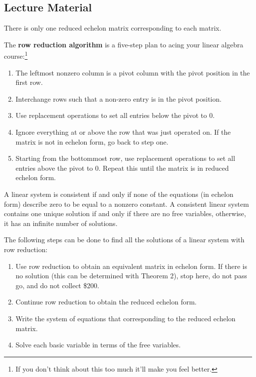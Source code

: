 \documentclass{article}
\begin{document}
\subsection{Lecture Material}

\begin{theorem}
There is only one reduced echelon matrix corresponding to each matrix.
\end{theorem}

The \textbf{row reduction algorithm} is a five-step plan to acing your linear
algebra course:\footnote{If you don't think about this too much it'll make you feel better.}

\begin{enumerate}

\item
The leftmost nonzero column is a pivot column with the pivot position in the
first row.

\item
Interchange rows such that a non-zero entry is in the pivot position.

\item
Use replacement operations to set all entries below the pivot to 0.

\item
Ignore everything at or above the row that was just operated on. If the matrix
is not in echelon form, go back to step one.

\item
Starting from the bottommost row, use replacement operations to set all entries
above the pivot to 0. Repeat this until the matrix is in reduced echelon form.

\end{enumerate}

\begin{theorem}
A linear system is consistent if and only if none of the equations (in echelon
form) describe zero to be equal to a nonzero constant. A consistent linear
system contains one unique solution if and only if there are no free variables,
otherwise, it has an infinite number of solutions.
\end{theorem}

The following steps can be done to find all the solutions of a linear system
with row reduction:

\begin{enumerate}

\item
Use row reduction to obtain an equivalent matrix in echelon form. If there is
no solution (this can be determined with Theorem 2), stop here, do not pass go,
and do not collect \$200.

\item
Continue row reduction to obtain the reduced echelon form.

\item
Write the system of equations that corresponding to the reduced echelon matrix.

\item
Solve each basic variable in terms of the free variables.

\end{enumerate}
\end{document}
